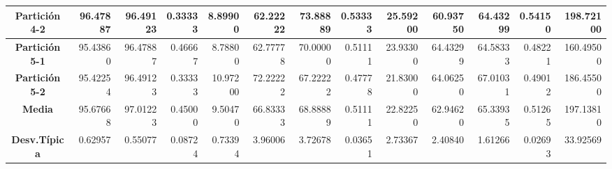 \documentclass[a4paper,11pt]{article}
\begin{document}
\begin{table}[H]
\begin{adjustbox}{width=1.1\textwidth}
\begin{tabular}{|c|r|r|r|r|r|r|r|r|r|r|r|r|}
  \textbf{Partición 4-2} & 96.47887 & 96.49123 & 0.33333 & 8.89900 & 62.22222 & 73.88889 & 0.53333 & 25.59200 & 60.93750 & 64.43299 & 0.54150 & 198.72100 \\ \hline
  \textbf{Partición 5-1} & 95.43860 & 96.47887 & 0.46667 & 8.78800 & 62.77778 & 70.00000 & 0.51111 & 23.93300 & 64.43299 & 64.58333 & 0.48221 & 160.49500 \\ \hline
  \textbf{Partición 5-2} & 95.42254 & 96.49123 & 0.33333 & 10.97200 & 72.22222 & 67.22222 & 0.47778 & 21.83000 & 64.06250 & 67.01031 & 0.49012 & 186.45500 \\ \hline
  \textbf{Media} & 95.67668 & 97.01223 & 0.45000 & 9.50470 & 66.83333 & 68.88889 & 0.51111 & 22.82250 & 62.94620 & 65.33935 & 0.51265 & 197.13810 \\ \hline
  \textbf{Desv.Típica} & 0.62957 & 0.55077 & 0.08724 & 0.73394 & 3.96006 & 3.72678 & 0.03651 & 2.73367 & 2.40840 & 1.61266 & 0.02693 & 33.92569 \\ \hline
  \end{tabular}
  \end{adjustbox}
  \label{AM3}
  \end{table}
  
  
  
\end{document}
